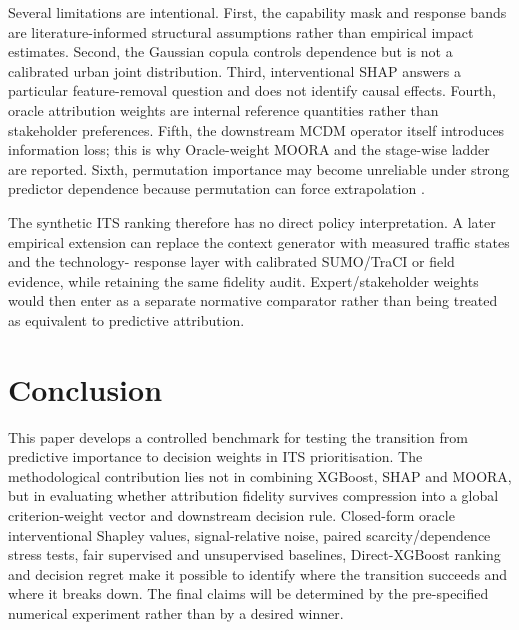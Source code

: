 \documentclass[runningheads]{llncs}
\begin{document}
Several limitations are intentional. First, the capability mask and response bands are
literature-informed structural assumptions rather than empirical impact estimates. Second, the
Gaussian copula controls dependence but is not a calibrated urban joint distribution. Third,
interventional SHAP answers a particular feature-removal question and does not identify causal
effects. Fourth, oracle attribution weights are internal reference quantities rather than
stakeholder preferences. Fifth, the downstream MCDM operator itself introduces information loss;
this is why Oracle-weight MOORA and the stage-wise ladder are reported. Sixth, permutation
importance may become unreliable under strong predictor dependence because permutation can
force extrapolation \cite{hooker2021permutation}.

The synthetic ITS ranking therefore has no direct policy interpretation. A later empirical
extension can replace the context generator with measured traffic states and the technology-
response layer with calibrated SUMO/TraCI or field evidence, while retaining the same fidelity
audit. Expert/stakeholder weights would then enter as a separate normative comparator rather
than being treated as equivalent to predictive attribution.

\section{Conclusion}
\label{sec:conclusion}

This paper develops a controlled benchmark for testing the transition from predictive
importance to decision weights in ITS prioritisation. The methodological contribution lies not
in combining XGBoost, SHAP and MOORA, but in evaluating whether attribution fidelity survives
compression into a global criterion-weight vector and downstream decision rule. Closed-form
oracle interventional Shapley values, signal-relative noise, paired scarcity/dependence stress
tests, fair supervised and unsupervised baselines, Direct-XGBoost ranking and decision regret
make it possible to identify where the transition succeeds and where it breaks down. The final
claims will be determined by the pre-specified numerical experiment rather than by a desired
winner.
\end{document}
